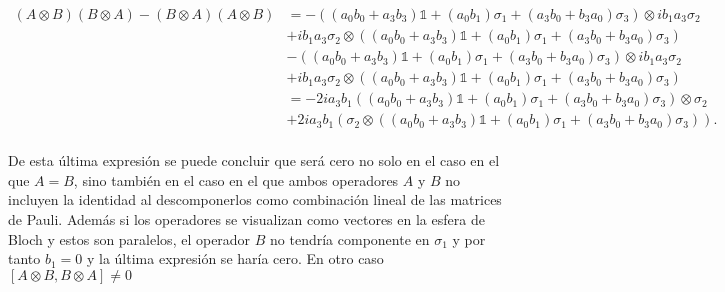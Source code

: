           \[\begin{split}(A\otimes B)(B\otimes A)-(B\otimes A)(A\otimes B)
            &=-((a_0b_0+a_3b_3)\mathds{1}+(a_0b_1)\sigma_1+(a_3b_0+b_3a_0)\sigma_3)\otimes ib_1a_3\sigma_2 \\
            &+ib_1a_3\sigma_2 \otimes ((a_0b_0+a_3b_3)\mathds{1}+(a_0b_1)\sigma_1 +(a_3b_0+b_3a_0)\sigma_3) \\
            &-((a_0b_0+a_3b_3)\mathds{1}+(a_0b_1)\sigma_1+(a_3b_0+b_3a_0)\sigma_3)\otimes ib_1a_3\sigma_2 \\
            &+ib_1a_3\sigma_2 \otimes ((a_0b_0+a_3b_3)\mathds{1}+(a_0b_1)\sigma_1 +(a_3b_0+b_3a_0)\sigma_3) \\
            &=-2ia_3b_1((a_0b_0+a_3b_3)\mathds{1}+(a_0b_1)\sigma_1+(a_3b_0+b_3a_0)\sigma_3)\otimes \sigma_2 \\
            &+2ia_3b_1(\sigma_2 \otimes ((a_0b_0+a_3b_3)\mathds{1}+(a_0b_1)\sigma_1 +(a_3b_0+b_3a_0)\sigma_3) ).\\
        \end{split}\]  %

De esta última expresión se puede concluir que será cero no solo en el caso en el que $A=B$, sino también en el caso en el que  ambos operadores $A$ y $B$ no incluyen la identidad al descomponerlos como combinación lineal de las matrices de Pauli. Además si los operadores se visualizan como vectores en la esfera de Bloch y estos son paralelos, el operador $B$ no tendría componente en $\sigma_1$ y por tanto $b_1=0$ y la última expresión se haría cero. En otro caso $[A\otimes B, B \otimes A]\ne 0$
\begin{center}
\begin{minipage}{11cm} 
    
\end{minipage}
\end{center}
